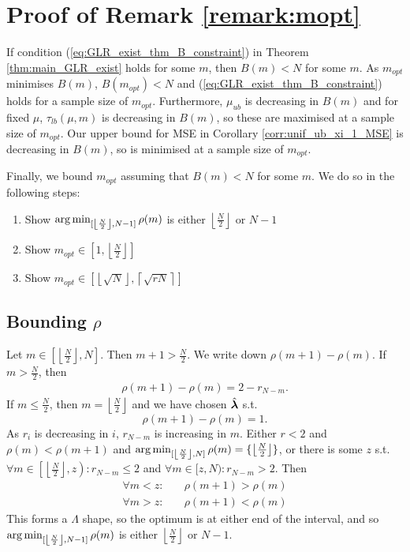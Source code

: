 \section{Proof of Remark \ref{remark:mopt}}
\label{app:proof_of_remark_GLR_mopt}

If condition (\ref{eq:GLR_exist_thm_B_constraint}) in Theorem \ref{thm:main_GLR_exist} holds for some $m$, then $B(m) < N$ for some $m$. As $m_{opt}$ minimises $B(m)$, $B(m_{opt}) < N$ and  (\ref{eq:GLR_exist_thm_B_constraint}) holds for a sample size of $m_{opt}$. Furthermore, $\mu_{ub}$ is decreasing in $B(m)$ and for fixed $\mu$, $\tau_{lb}(\mu,m)$ is decreasing in $B(m)$, so these are maximised at a sample size of $m_{opt}$. Our upper bound for MSE in Corollary \ref{corr:unif_ub_xi_1_MSE} is decreasing in $B(m)$, so is minimised at a sample size of $m_{opt}$.

Finally, we bound $m_{opt}$ assuming that $B(m) < N$ for some $m$. We do so in the following steps:
\begin{enumerate}
    \item Show $\operatorname*{arg\,min}_{[\left\lfloor\frac{N}{2}\right\rfloor, N-1]} \rho(m)$ is either $\left\lfloor\frac{N}{2}\right\rfloor$ or  $N-1$
    \item Show $m_{opt} \in \left[1,\left\lfloor\frac{N}{2}\right\rfloor\right]$
    \item Show $m_{opt} \in \left[\left\lfloor\sqrt{N}\right\rfloor, \left\lceil\sqrt{rN}\right\rceil \right]$
\end{enumerate}

\subsection{Bounding $\rho$}
Let $m \in \left[\left\lfloor \frac{N}{2}\right\rfloor, N\right]$. Then $m+1 > \frac{N}{2}$.
We write down $\rho(m+1) - \rho(m)$.
If $m > \frac{N}{2}$, then
\begin{align}
    \rho(m+1) - \rho(m) = 2 - r_{N-m}.
\end{align}
If $m \leq \frac{N}{2}$, then $m = \left\lfloor \frac{N}{2}\right\rfloor$ and we have chosen $\hat{\bm{\lambda}}$ s.t.
\begin{equation}
    \rho(m+1) - \rho(m) = 1.
\end{equation}
As $r_{i}$ is decreasing in $i$, $r_{N-m}$ is increasing in $m$. Either $r < 2$ and $\rho(m) < \rho(m+1)$ and $\operatorname*{arg\,min}_{[\left\lfloor\frac{N}{2}\right\rfloor, N]} \rho(m) = \{ \left\lfloor\frac{N}{2}\right\rfloor \}$, or there is some $z$ s.t. $\forall m \in \left[\left\lfloor\frac{N}{2}\right\rfloor, z\right): r_{N-m} \leq 2$ and $\forall  m \in [z,N): r_{N-m} > 2$.
Then
\begin{align}
    \forall m < z:\quad &\rho(m+1) > \rho(m) \\
    \forall m > z:\quad &\rho(m+1) < \rho(m)
\end{align}
This forms a $\Lambda$ shape, so the optimum is at either end of the interval, and so $\operatorname*{arg\,min}_{[\left\lfloor\frac{N}{2}\right\rfloor, N-1]} \rho(m)$ is either $\left\lfloor\frac{N}{2}\right\rfloor$ or  $N-1$.
